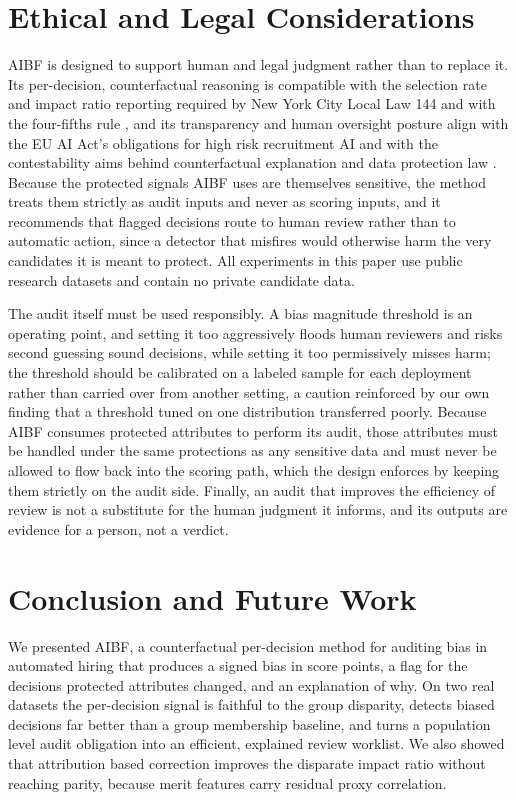 \documentclass[conference]{IEEEtran}
\begin{document}
\section{Ethical and Legal Considerations}
\label{sec:ethics}
AIBF is designed to support human and legal judgment rather than to replace it. Its
per-decision, counterfactual reasoning is compatible with the selection rate and
impact ratio reporting required by New York City Local Law 144 \cite{ll144} and with
the four-fifths rule \cite{uniform}, and its transparency and human oversight posture
align with the EU AI Act's obligations for high risk recruitment AI \cite{euaiact}
and with the contestability aims behind counterfactual explanation \cite{wachter} and
data protection law \cite{gdpr}. Because the protected signals AIBF uses are
themselves sensitive, the method treats them strictly as audit inputs and never as
scoring inputs, and it recommends that flagged decisions route to human review rather
than to automatic action, since a detector that misfires would otherwise harm the very
candidates it is meant to protect. All experiments in this paper use public research
datasets and contain no private candidate data.

The audit itself must be used responsibly. A bias magnitude threshold is an operating
point, and setting it too aggressively floods human reviewers and risks second guessing
sound decisions, while setting it too permissively misses harm; the threshold should be
calibrated on a labeled sample for each deployment rather than carried over from another
setting, a caution reinforced by our own finding that a threshold tuned on one
distribution transferred poorly. Because AIBF consumes protected attributes to perform
its audit, those attributes must be handled under the same protections as any sensitive
data and must never be allowed to flow back into the scoring path, which the design
enforces by keeping them strictly on the audit side. Finally, an audit that improves the
efficiency of review is not a substitute for the human judgment it informs, and its
outputs are evidence for a person, not a verdict.

\section{Conclusion and Future Work}
\label{sec:conc}
We presented AIBF, a counterfactual per-decision method for auditing bias in automated
hiring that produces a signed bias in score points, a flag for the decisions protected
attributes changed, and an explanation of why. On two real datasets the per-decision
signal is faithful to the group disparity, detects biased decisions far better than a
group membership baseline, and turns a population level audit obligation into an
efficient, explained review worklist. We also showed that attribution based
correction improves the disparate impact ratio without reaching parity, because merit
features carry residual proxy correlation.
\end{document}
